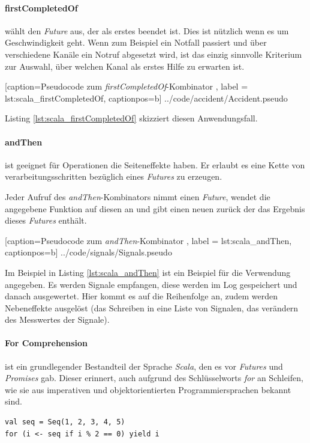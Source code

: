 \paragraph{firstCompletedOf} wählt den \emph{Future} aus, der als
erstes beendet ist. Dies ist nützlich wenn es um Geschwindigkeit
geht. Wenn zum Beispiel ein Notfall passiert und über verschiedene
Kanäle ein Notruf abgesetzt wird, ist das einzig sinnvolle Kriterium
zur Auswahl, über welchen Kanal als erstes Hilfe zu erwarten ist.


    [caption={Pseudocode zum \emph{firstCompletedOf}-Kombinator },
       label = lst:scala_firstCompletedOf,
       captionpos=b]
 {../code/accident/Accident.pseudo}
 
Listing \ref{lst:scala_firstCompletedOf} skizziert diesen
Anwendungsfall.

\paragraph{andThen} ist geeignet für Operationen die Seiteneffekte
haben. Er erlaubt es eine Kette von verarbeitungsschritten bezüglich
eines \emph{Futures} zu erzeugen.

Jeder Aufruf des \emph{andThen}-Kombinators nimmt einen \emph{Future},
wendet die angegebene Funktion auf diesen an und gibt einen neuen
zurück der das Ergebnis dieses \emph{Futures} enthält.


    [caption={Pseudocode zum \emph{andThen}-Kombinator },
       label = lst:scala_andThen,
       captionpos=b]
 {../code/signals/Signals.pseudo}
 
Im Beispiel in Listing \ref{lst:scala_andThen} ist ein Beispiel
für die Verwendung angegeben. Es werden Signale empfangen, diese
werden im Log gespeichert und danach ausgewertet. Hier kommt es auf
die Reihenfolge an, zudem werden Nebeneffekte ausgelöst (das Schreiben
in eine Liste von Signalen, das verändern des Messwertes der Signale).

\paragraph{For Comprehension} ist ein grundlegender Bestandteil
der Sprache \emph{Scala}, den es vor \emph{Futures} und \emph{Promises}
gab. Dieser erinnert, auch aufgrund des Schlüsselworts \emph{for}
an Schleifen, wie sie aus imperativen und objektorientierten
Programmiersprachen bekannt sind.

\begin{lstlisting}[caption={For Comprehension},label={lst:forComprehension},captionpos=b]
val seq = Seq(1, 2, 3, 4, 5)
for (i <- seq if i % 2 == 0) yield i
\end{lstlisting}

